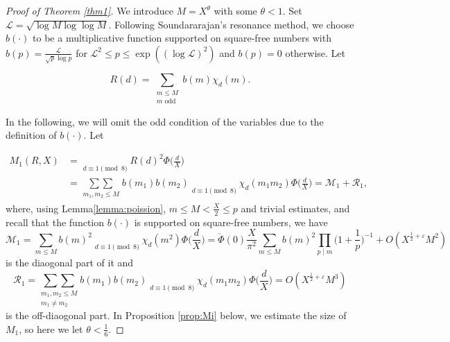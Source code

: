 \documentclass[12pt,reqno]{amsart}
\numberwithin{equation}{section}
\theoremstyle{plain}
\theoremstyle{definition}
\theoremstyle{remark}
\begin{document}
\begin{proof}[Proof of Theorem \ref{thm1}]
We introduce $M=X^{\theta}$ with some $\theta< 1$.
Set $\mathcal{L}=\sqrt{\log M\log\log M}$.
Following Soundararajan's resonance method\cite{So08}, we choose $b(\cdot)$ to be a multiplicative function supported on square-free numbers with $b(p)=\frac{\mathcal{L}}{\sqrt{p}\log p}$ for $\mathcal{L}^2\leq p \leq \exp((\log \mathcal{L})^2)$ and $b(p)=0$ otherwise.
Let

\begin{equation*}\label{def:resonator}
  R(d)=\sum_{\substack{m\leq M \\ m \text{ odd}}}b(m)\chi_{d}(m).
\end{equation*}

In the following, we will omit the odd condition of the variables due to the definition of $b(\cdot)$.
Let

\begin{align*}
  M_1(R,X)
  &=\mathop{\sum\nolimits^\flat}\limits_{d\equiv 1\pmod 8}
  R(d)^2\Phi\bigg(\frac{d}{X}\bigg) \\
  &=\underset{\substack{m_1,m_2\leq M}}{\sum\sum}b(m_1)b(m_2)
 \mathop{\sum\nolimits^\flat}\limits_{d\equiv 1\pmod 8}
 \chi_d(m_1m_2)
  \Phi\bigg(\frac{d}{X}\bigg)
  =\mathcal{M}_1+\mathcal{R}_1,
\end{align*}
where, using Lemma\ref{lemma:poission}, $m\le M<\frac{X}{2}\le p$ and trivial estimates, and recall that the function $b(\cdot)$ is supported on square-free numbers, we have
\begin{equation*}
  \mathcal{M}_1=\sum_{m\leq M} b(m)^2 \mathop{\sum\nolimits^\flat}\limits_{d\equiv 1\pmod 8}\chi_{d}(m^2)
  \Phi\bigg(\frac{d}{X}\bigg)
  =  \check{\Phi}(0)\frac{X}{\pi^2}\sum_{m\leq M} b(m)^2\prod_{p\mid m}
    \bigg(1+\frac{1}{p}\bigg)^{-1} +
    O(X^{\frac{1}{2}+\varepsilon}M^2)
\end{equation*}
is the diaogonal part of it and
\begin{equation*}
  \mathcal{R}_1
  =\underset{\substack{m_1,m_2\leq M\\m_1\neq m_2}}{\sum\sum}b(m_1)b(m_2)
  \mathop{\sum\nolimits^\flat}\limits_{d\equiv 1\pmod 8}
 \chi_d(m_1m_2)\Phi\bigg(\frac{d}{X}\bigg)
 =O(X^{\frac{1}{2}+\varepsilon}M^3)
\end{equation*}
is the off-diaogonal part.
In Proposition \ref{prop:Mi} below, we estimate the size of $M_1$, so here we let $\theta < \frac{1}{6}$.


\end{proof}
\end{document}
